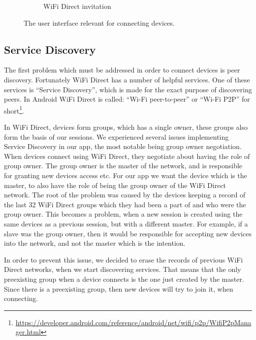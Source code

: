\begin{figure}[ht]
\begin{subfigure}[b]{0.33\linewidth}
    \caption{WiFi Direct invitation}
    \label{fig:wifidirectinv}
    \vspace{4ex}
  \end{subfigure}
  \caption{The user interface relevant for connecting devices.}
  \label{fig:connecting}
\end{figure}

\subsection{Service Discovery}

The first problem which must be addressed in order to connect devices is peer discovery.
Fortunately WiFi Direct has a number of helpful services.
One of these services is ``Service Discovery'', which is made for the exact purpose of discovering peers.
In Android WiFi Direct is called: ``Wi-Fi peer-to-peer'' or ``Wi-Fi P2P'' for short\footnote{\url{https://developer.android.com/reference/android/net/wifi/p2p/WifiP2pManager.html}}.

In WiFi Direct, devices form groups, which has a single owner, these groups also form the basis of our sessions.
We experienced several issues implementing Service Discovery in our app, the most notable being group owner negotiation.
When devices connect using WiFi Direct, they negotiate about having the role of group owner.
The group owner is the master of the network, and is responsible for granting new devices access etc.
For our app we want the device which is the master, to also have the role of being the group owner of the WiFi Direct network.
The root of the problem was caused by the devices keeping a record of the last 32 WiFi Direct groups which they had been a part of and who were the group owner.
This becomes a problem, when a new session is created using the same devices as a previous session, but with a different master.
For example, if a slave was the group owner, then it would be responsible for accepting new devices into the network, and not the master which is the intention.

In order to prevent this issue, we decided to erase the records of previous WiFi Direct networks, when we start discovering services.
That means that the only preexisting group when a device connects is the one just created by the master.
Since there is a preexisting group, then new devices will try to join it, when connecting.

